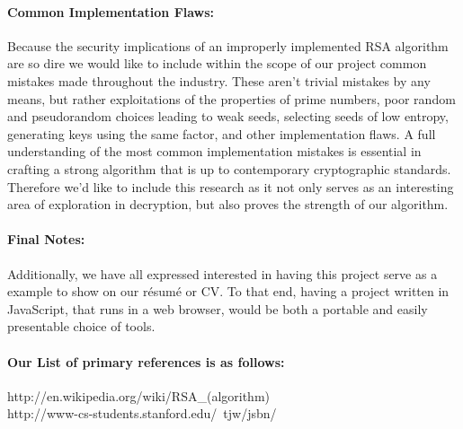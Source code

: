 \documentclass[12pt]{article}
\begin{document}
\paragraph{Common Implementation Flaws:\\}
Because the security implications of an improperly implemented RSA algorithm 
are so dire we would like to include within the scope of our project common 
mistakes made throughout the industry. These aren’t trivial mistakes by any means, 
but rather exploitations of the properties of prime numbers, poor random and 
pseudorandom choices leading to weak seeds, selecting seeds of low entropy, 
generating keys using the same factor, and other implementation flaws. A full 
understanding of the most common implementation mistakes is essential in crafting 
a strong algorithm that is up to contemporary cryptographic standards. Therefore 
we’d like to include this research as it not only serves as an interesting area 
of exploration in decryption, but also proves the strength of our algorithm.


\paragraph{Final Notes:\\}
Additionally, we have all expressed interested in having this project serve as 
a example to show on our résumé or CV. To that end, having a project written in
JavaScript, that runs in a web browser, would be both a portable and easily 
presentable choice of tools.

\paragraph{Our List of primary references is as follows:\\}
http://en.wikipedia.org/wiki/RSA\_(algorithm)\\
http://www-cs-students.stanford.edu/~tjw/jsbn/
\end{document}
